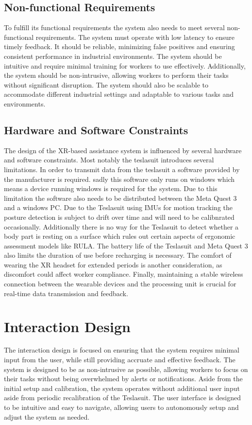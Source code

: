 \subsection{Non-functional Requirements}
To fulfill its functional requirements the system also needs to meet several non-functional requirements. 
The system must operate with low latency to ensure timely feedback. It should be reliable, minimizing false positives and ensuring consistent performance in industrial environments. The system should be intuitive and require minimal training for workers to use effectively. Additionally, the system should be non-intrusive, allowing workers to perform their tasks without significant disruption. The system should also be scalable to accommodate different industrial settings and adaptable to various tasks and environments.

\subsection{Hardware and Software Constraints}
The design of the XR-based assistance system is influenced by several hardware and software constraints. 
Most notably the teslasuit introduces several limitations. In order to transmit data from the teslasuit a software provided by the manufacturer is required. sadly this software only runs on windows which means a device running windows is required for the system. Due to this limitation the software also needs to be distributed between the Meta Quest 3 and a windows PC. Due to the Teslasuit using IMUs for motion tracking the posture detection is subject to drift over time and will need to be calibnrated occasionally. Additionally there is no way for the Teslasuit to detect whether a body part is resting on a surface which rules out certain aspects of ergonomic assessment models like RULA. The battery life of the Teslasuit and Meta Quest 3 also limits the duration of use before recharging is necessary. The comfort of wearing the XR headset for extended periods is another consideration, as discomfort could affect worker compliance. Finally, maintaining a stable wireless connection between the wearable devices and the processing unit is crucial for real-time data transmission and feedback.

\section{Interaction Design}
The interaction design is focused on ensuring that the system requires minimal input from the user, while still providing accruate and effective feedback. The system is designed to be as non-intrusive as possible, allowing workers to focus on their tasks without being overwhelmed by alerts or notifications. Aside from the initial setup and calibration, the system operates without additional user input aside from periodic recalibration of the Teslasuit. The user interface is designed to be intuitive and easy to navigate, allowing users to autonomously setup and adjust the system as needed.

